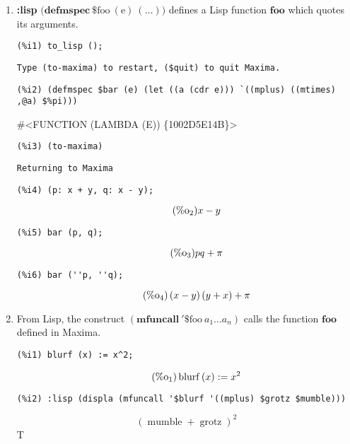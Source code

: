 \documentclass[12pt,leqno]{article}
\begin{document}
\begin{enumerate}
\item {\bf :lisp} $\mathrm{(}\mathbf{defmspec\ } \mathrm{\$foo\ (e)\ (\ldots))}$
defines a Lisp function $\mathbf{foo}$ which quotes its arguments.
\begin{verbatim}
(%i1) to_lisp ();
\end{verbatim}
\begin{Verbatim}
Type (to-maxima) to restart, ($quit) to quit Maxima.
\end{Verbatim}
\begin{verbatim}
(%i2) (defmspec $bar (e) (let ((a (cdr e))) `((mplus) ((mtimes) ,@a) $%pi)))
\end{verbatim}
\#\textless FUNCTION (LAMBDA (E)) \{1002D5E14B\}\textgreater 
\begin{verbatim}
(%i3) (to-maxima)
\end{verbatim}
\begin{Verbatim}
Returning to Maxima
\end{Verbatim}
\begin{verbatim}
(%i4) (p: x + y, q: x - y);
\end{verbatim}
\begin{equation}
\tag{$\mathop{\mathrm{\%o}}_{2}$}x-y
\label{eq:doc-group1-code38-4-1}
\end{equation}
\begin{verbatim}
(%i5) bar (p, q);
\end{verbatim}
\begin{equation}
\tag{$\mathop{\mathrm{\%o}}_{3}$}p q+\pi
\label{eq:doc-group1-code38-5-1}
\end{equation}
\begin{verbatim}
(%i6) bar (''p, ''q);
\end{verbatim}
\begin{equation}
\tag{$\mathop{\mathrm{\%o}}_{4}$}\left(x-y\right) \left(y+x\right)+\pi
\label{eq:doc-group1-code38-6-1}
\end{equation}


\item From Lisp, the construct $(\mathbf{mfuncall\ '\$}\mathrm{foo\ }a_1 \ldots a_n)$
calls the function $\mathbf{foo}$ defined in Maxima.

\begin{verbatim}
(%i1) blurf (x) := x^2;
\end{verbatim}
\begin{equation}
\tag{$\mathop{\mathrm{\%o}}_{1}$}\mathop{\mathrm{blurf}}\left(x\right) := {x}^{2}
\label{eq:doc-group1-code39-1-1}
\end{equation}
\begin{verbatim}
(%i2) :lisp (displa (mfuncall '$blurf '((mplus) $grotz $mumble)))
\end{verbatim}
\begin{equation}
{\left(\mathop{\mathrm{mumble}}+\mathop{\mathrm{grotz}}\right)}^{2}
\label{eq:doc-group1-code39-2-1}
\end{equation}
T

\end{enumerate}
\end{document}
